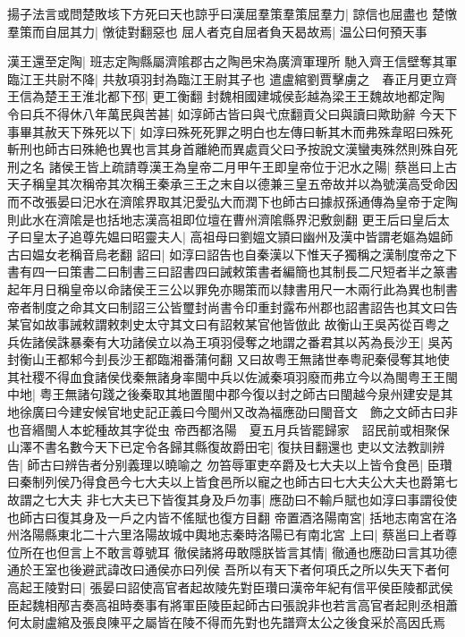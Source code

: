 揚子法言或問楚敗垓下方死曰天也諒乎曰漢屈羣策羣策屈羣力|{
	諒信也屈盡也}
楚憞羣策而自屈其力|{
	憞徒對翻惡也}
屈人者克自屈者負天曷故焉|{
	温公曰何預天事}


漢王還至定陶|{
	班志定陶縣屬濟隂郡古之陶邑宋為廣濟軍理所}
馳入齊王信壁奪其軍　臨江王共尉不降|{
	共敖項羽封為臨江王尉其子也}
遣盧綰劉賈擊虜之　春正月更立齊王信為楚王王淮北都下邳|{
	更工衡翻}
封魏相國建城侯彭越為梁王王魏故地都定陶　令曰兵不得休八年萬民與苦甚|{
	如淳師古皆曰與弋庶翻貢父曰與讀曰歟助辭}
今天下事畢其赦天下殊死以下|{
	如淳曰殊死死罪之明白也左傳曰斬其木而弗殊韋昭曰殊死斬刑也師古曰殊絶也異也言其身首離絶而異處貢父曰予按說文漢蠻夷殊然則殊自死刑之名}
諸侯王皆上疏請尊漢王為皇帝二月甲午王即皇帝位于汜水之陽|{
	蔡邕曰上古天子稱皇其次稱帝其次稱王秦承三王之末自以德兼三皇五帝故并以為號漢高受命因而不改張晏曰汜水在濟隂界取其汜愛弘大而潤下也師古曰據叔孫通傳為皇帝于定陶則此水在濟隂是也括地志漢高祖即位壇在曹州濟隂縣界汜敷劍翻}
更王后曰皇后太子曰皇太子追尊先媪曰昭靈夫人|{
	高祖母曰劉媼文頴曰幽州及漢中皆謂老嫗為媪師古曰媪女老稱音烏老翻}
詔曰|{
	如淳曰詔告也自秦漢以下惟天子獨稱之漢制度帝之下書有四一曰策書二曰制書三曰詔書四曰誡敕策書者編簡也其制長二尺短者半之篆書起年月日稱皇帝以命諸侯王三公以罪免亦賜策而以隸書用尺一木兩行此為異也制書帝者制度之命其文曰制詔三公皆璽封尚書令印重封露布州郡也詔書詔告也其文曰告某官如故事誡敕謂敕刺史太守其文曰有詔敕某官他皆倣此}
故衡山王吳芮從百粤之兵佐諸侯誅暴秦有大功諸侯立以為王項羽侵奪之地謂之番君其以芮為長沙王|{
	吳芮封衡山王都邾今刲長沙王都臨湘番蒲何翻}
又曰故粤王無諸世奉粤祀秦侵奪其地使其社稷不得血食諸侯伐秦無諸身率閩中兵以佐滅秦項羽廢而弗立今以為閩粤王王閩中地|{
	粤王無諸句踐之後秦取其地置閩中郡今復以封之師古曰閩越今泉州建安是其地徐廣曰今建安候官地史記正義曰今閩州又改為福應劭曰閩音文　飾之文師古曰非也音緡閩人本蛇種故其字從虫}
帝西都洛陽　夏五月兵皆罷歸家　詔民前或相聚保山澤不書名數今天下已定令各歸其縣復故爵田宅|{
	復扶目翻還也}
吏以文法教訓辨告|{
	師古曰辨告者分别義理以曉喻之}
勿笞辱軍吏卒爵及七大夫以上皆令食邑|{
	臣瓚曰秦制列侯乃得食邑今七大夫以上皆食邑所以寵之也師古曰七大夫公大夫也爵第七故謂之七大夫}
非七大夫已下皆復其身及戶勿事|{
	應劭曰不輸戶賦也如淳曰事謂役使也師古曰復其身及一戶之内皆不傜賦也復方目翻}
帝置酒洛陽南宮|{
	括地志南宮在洛州洛陽縣東北二十六里洛陽故城中輿地志秦時洛陽已有南北宮}
上曰|{
	蔡邕曰上者尊位所在也但言上不敢言尊號耳}
徹侯諸將毋敢隱朕皆言其情|{
	徹通也應劭曰言其功德通於王室也後避武諱改曰通侯亦曰列侯}
吾所以有天下者何項氏之所以失天下者何高起王陵對曰|{
	張晏曰詔使高官者起故陵先對臣瓚曰漢帝年紀有信平侯臣陵都武侯臣起魏相邴吉奏高祖時奏事有將軍臣陵臣起師古曰張說非也若言高官者起則丞相蕭何太尉盧綰及張良陳平之屬皆在陵不得而先對也先譜齊太公之後食采於高因氏焉}

